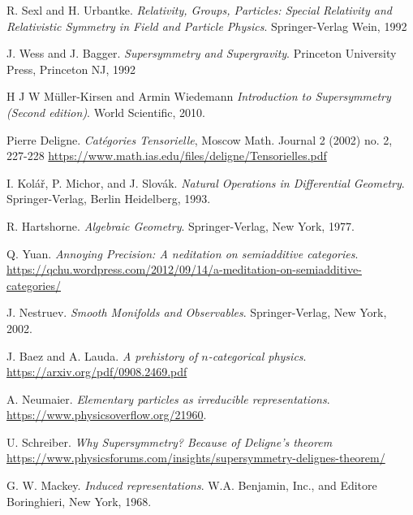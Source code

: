 \documentclass[a4paper,10pt]{scrreprt}
\theoremstyle{definition}
\theoremstyle{plain}
\theoremstyle{remark}
\begin{document}
\begin{thebibliography}{9}
   R. Sexl and H. Urbantke.
    \textit{Relativity, Groups, Particles: Special Relativity and Relativistic Symmetry in Field and Particle Physics}.
    Springer-Verlag Wein, 1992

   J. Wess and J. Bagger.
    \textit{Supersymmetry and Supergravity}.
    Princeton University Press, Princeton NJ, 1992

   H J W M{\"u}ller-Kirsen and Armin Wiedemann
    \textit{Introduction to Supersymmetry (Second edition)}.
    World Scientific, 2010.

   Pierre Deligne.
    \textit{Cat{\'e}gories Tensorielle},
    Moscow Math. Journal 2 (2002) no. 2, 227-228
    \url{https://www.math.ias.edu/files/deligne/Tensorielles.pdf}

   I. Kol\'{a}\v{r}, P. Michor, and J. Slov\'{a}k.
    \textit{Natural Operations in Differential Geometry}.
    Springer-Verlag, Berlin Heidelberg, 1993.

   R. Hartshorne.
    \textit{Algebraic Geometry}.
    Springer-Verlag, New York, 1977.

   Q. Yuan.
    \textit{Annoying Precision: A neditation on semiadditive categories}.
    \url{https://qchu.wordpress.com/2012/09/14/a-meditation-on-semiadditive-categories/}

   J. Nestruev.
    \textit{Smooth Monifolds and Observables}.
    Springer-Verlag, New York, 2002.

   J. Baez and A. Lauda. 
    \textit{A prehistory of $n$-categorical physics}.
    \url{https://arxiv.org/pdf/0908.2469.pdf}

   A. Neumaier.
    \textit{Elementary particles as irreducible representations}.
    \url{https://www.physicsoverflow.org/21960}.

   U. Schreiber.
    \textit{Why Supersymmetry? Because of Deligne's theorem}
    \url{https://www.physicsforums.com/insights/supersymmetry-delignes-theorem/}

   G. W. Mackey.
    \textit{Induced representations}.
    W.A. Benjamin, Inc., and Editore Boringhieri, New York, 1968.


\end{thebibliography}
\end{document}
